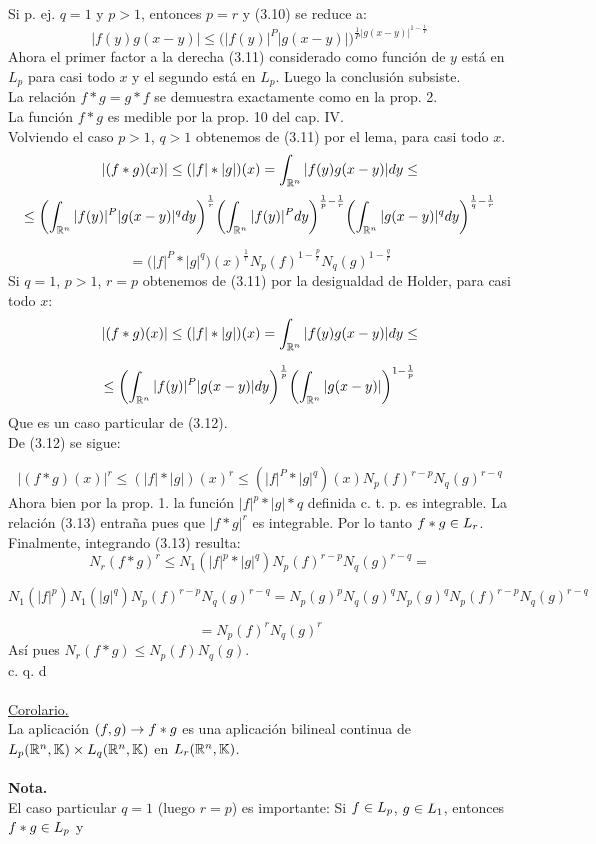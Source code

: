 Si p. ej. $q=1$ y $p>1$, entonces $p=r$ y (3.10) se reduce a: 
\begin{equation}
|f(y) g(x-y)| \leq \biggl( |f(y)|^P |g(x-y)| \biggl)^{\frac{1}{P}|g(x-y)|^{1-\frac{1}{P}}}
\end{equation}
Ahora el primer factor a la derecha (3.11) considerado como función de $y$ está en $L_p$ para casi todo $x$ y el segundo está en $L_p$. Luego la conclusión subsiste. \\
La relación $f*g=g*f$ se demuestra exactamente como en la  prop. 2. \\
La función $f*g$ es medible por la prop. 10 del cap. IV.  \\
Volviendo el caso $p>1$, $q>1$ obtenemos de (3.11) por el lema, para casi todo $x$. 
\begin{equation}
|(f*g)(x)| \leq (|f|*|g|)(x)=\int_{\mathbb{R}^n}|f(y)g(x-y)| dy \leq
\end{equation}
$$
\leq \biggl( \int_{\mathbb{R}^n}|f(y)|^P |g(x-y)|^q dy  \biggl)^{\frac{1}{r}} \biggl( \int_{\mathbb{R}^n}|f(y)|^P dy \biggl)^{\frac{1}{p}-\frac{1}{r}} \biggl( \int_{\mathbb{R}^n} |g(x-y)|^q dy \biggl)^{\frac{1}{q}-\frac{1}{r}}
$$

$$
= \biggl( |f|^P * |g|^q)(x)^{\frac{1}{r}}N_p(f)^{1-\frac{p}{r}}N_q (g)^{1-\frac{q}{r}}
$$
Si  $q=1$, $p>1$, $r=p$ obtenemos de (3.11) por la desigualdad de Holder, para casi todo $x$:
$$
|(f*g)(x)| \leq (|f| *|g|)(x)=\int_{\mathbb{R}^n}|f(y)g(x-y)|dy \leq
$$

$$
\leq \biggl( \int_{\mathbb{R}^n} |f(y)|^P |g(x-y)|dy \biggl)^{\frac{1}{p}}\biggl(\int_{\mathbb{R}^n} |g(x-y)| \biggl)^{1-\frac{1}{p}}
$$
Que es un caso particular de (3.12). \\
De (3.12) se sigue:

\begin{equation}
|(f*g)(x)|^r \leq (|f|*|g|)(x)^r \leq (|f|^P *|g|^q)(x) N_p (f)^{r-p}N_q (g)^{r-q}
\end{equation}
Ahora bien por la prop. 1. la función $|f|^p *|g|*q$ definida c. t. p. es integrable. La relación (3.13) entraña pues que $|f*g|^r$ es integrable. Por lo tanto $f*g \in L_r$.\\
Finalmente, integrando (3.13) resulta:
$$N_r(f*g)^r \leq N_1 (|f|^p * |g|^q )N_p (f)^{r-p}N_q (g)^{r-q}=$$

$$
N_1 (|f|^p)N_1(|g|^q)N_p(f)^{r-p}N_q(g)^{r-q}=N_p(g)^p N_q (g)^q N_p (g)^q N_p (f)^{r-p}N_q (g)^{r-q}
$$

$$
=N_p (f )^r N_q(g)^r
$$
Así pues $N_r (f*g) \leq N_p (f) N_q (g)$. \\
  \phantom{sssssssssssssssssssssssssssssssssss sasdasdasdasdadadssada} c. q. d \\ \\
  \underline{Corolario.} \\
  La aplicación $(f,g) \rightarrow f*g$ es una aplicación bilineal continua de $L_p (\mathbb{R}^n, \mathbb{K}) \times L_q (\mathbb{R}^n, \mathbb{K})$ en $L_r(\mathbb{R}^n,\mathbb{K})$. \\ \\
  \textbf{Nota.} \\
 El caso particular $q=1$ (luego $r=p$) es importante:
Si $f \in L_p$, $g \in L_1$, entonces $f *g \in L_p$ y 

